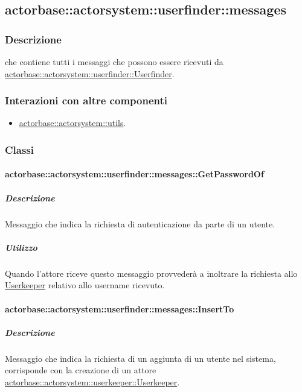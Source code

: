 \documentclass{scalatekids-article}
\begin{document}
\subsection{actorbase::actorsystem::userfinder::messages}
\label{sec:actorbase::actorsystem::userfinder::messages}

\subsubsection{Descrizione}
 che contiene tutti i messaggi che possono essere ricevuti da
\hyperref[sec:actorbase::actorsystem::userfinder::Userfinder]{actorbase::actorsystem::userfinder::Userfinder}.


\subsubsection{Interazioni con altre componenti}
\begin{itemize}
\item \hyperref[sec:actorbase::actorsystem::utils]{actorbase::actorsystem::utils}.
\end{itemize}

\subsubsection{Classi}

\paragraph{actorbase::actorsystem::userfinder::messages::GetPasswordOf}
\label{sec:actorbase::actorsystem::userfinder::messages::GetPasswordOf}

\subparagraph{Descrizione}
Messaggio che indica la richiesta di autenticazione da parte di un utente.\\

\subparagraph{Utilizzo}
Quando l'attore riceve questo messaggio provvederà a inoltrare la richiesta
allo \hyperref[sec:actorbase::actorsystem::userkeeper::Userkeeper]{Userkeeper}
relativo allo username ricevuto.

\paragraph{actorbase::actorsystem::userfinder::messages::InsertTo}
\label{sec:actorbase::actorsystem::userfinder::messages::InsertTo}

\subparagraph{Descrizione}
Messaggio che indica la richiesta di un aggiunta di un utente nel sistema,
corrisponde con la creazione di un attore \hyperref[sec:actorbase::actorsystem::userkeeper::Userkeeper]{actorbase::\allowbreak{}actorsystem::\allowbreak{}userkeeper::\allowbreak{}Userkeeper}.
\end{document}
